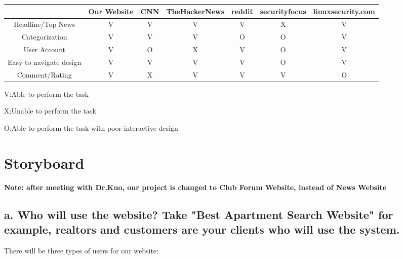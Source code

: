 \documentclass{article}
\begin{document}
\begin{table}[h!]
    \hskip-2.5cm\begin{tabular}{|c|c|c|c|c|c|c|}
    \hline
                   &  Our Website & CNN & TheHackerNews & reddit & securityfocus & linuxsecurity.com\\
    \hline
    Headline/Top News    &     V       &    V   &   V    &   V    &   X    &     V         \\
    \hline
    Categorization    &      V      &   V    &   V    &   O    &    O   &       V       \\
    \hline
    User Account    &     V      &   O    &    X   &   V    &    O   &      V       \\
    \hline
    Easy to navigate design    &      V      &   V    &   V    &  V     &   O    &    V          \\
    \hline
    Comment/Rating    &     V       &   X    &   V    &   V    &    V   &      O        \\ 
    \hline
    \end{tabular}
\end{table}
V:Able to perform the task\par
X:Unable to perform the task\par
O:Able to perform the task with poor interactive design\par



\section{Storyboard}

\textbf{Note: after meeting with Dr.Kuo, our project is changed to Club Forum Website, instead of News Website}

\subsection{a. Who will use the website? Take "Best Apartment Search Website" for example, realtors and customers are your clients who will use the system.}

There will be three types of users for our website:
\end{document}
